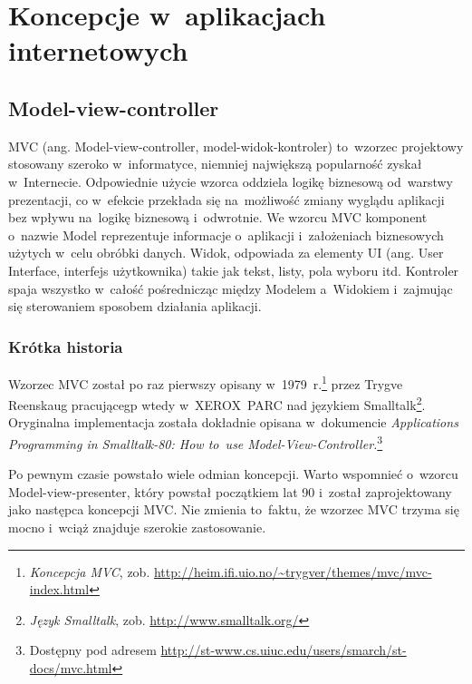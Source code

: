 \documentclass[a4paper,12pt,oneside]{report}
\begin{document}
\chapter{Koncepcje w~aplikacjach internetowych}
\label{cha:koncepcje}

\section{Model-view-controller}
\label{sec:mvc}
MVC (ang. Model-view-controller, model-widok-kontroler) to~wzorzec projektowy stosowany szeroko w~informatyce, niemniej największą popularność zyskał w~Internecie. Odpowiednie użycie wzorca oddziela logikę biznesową od~warstwy prezentacji, co w~efekcie przekłada się na~możliwość zmiany wyglądu aplikacji bez wpływu na~logikę biznesową i~odwrotnie. We wzorcu MVC komponent o~nazwie Model reprezentuje informacje o~aplikacji i~założeniach biznesowych użytych w~celu obróbki danych. Widok, odpowiada za elementy UI (ang. User Interface, interfejs użytkownika) takie jak tekst, listy, pola wyboru itd. Kontroler spaja wszystko w~całość pośrednicząc między Modelem a~Widokiem i~zajmując się sterowaniem sposobem działania aplikacji.

\subsection{Krótka historia}
\label{subsec:mvc-historia}
Wzorzec MVC został po raz pierwszy opisany w~1979~r.\footnote{\emph{Koncepcja MVC}, zob. \url{http://heim.ifi.uio.no/~trygver/themes/mvc/mvc-index.html}} przez Trygve Reenskaug pracującegp wtedy w~XEROX~PARC nad językiem Smalltalk\footnote{\emph{Język Smalltalk}, zob. \url{http://www.smalltalk.org/}}. Oryginalna implementacja została dokładnie opisana w~dokumencie \emph{Applications Programming in Smalltalk-80: How to~use Model-View-Controller.}\footnote{Dostępny pod adresem \url{http://st-www.cs.uiuc.edu/users/smarch/st-docs/mvc.html}}

Po pewnym czasie powstało wiele odmian koncepcji. Warto wspomnieć o~wzorcu Model-view-presenter, który powstał początkiem lat 90 i~został zaprojektowany jako następca koncepcji MVC. Nie zmienia to~faktu, że wzorzec MVC trzyma się mocno i~wciąż znajduje szerokie zastosowanie.
\end{document}
